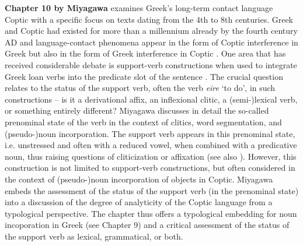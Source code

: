 \documentclass[output=paper,colorlinks,citecolor=brown]{langscibook}
\begin{document}
\textbf{Chapter 10 by Miyagawa} examines Greek’s long-term contact language Coptic with a specific focus on texts dating from the 4th to 8th centuries. Greek and Coptic had existed for more than a millennium already by the fourth century AD and language-contact phenomena appear in the form of Coptic interference in Greek \citep{fendelCopticInterferenceSyntax2022} but also in the form of Greek interference in Coptic \citep{grossmanLanguageSpecificTransitivitiesContact2019}. One area that has received considerable debate is support-verb constructions when used to integrate Greek loan verbs into the predicate slot of the sentence \citep{reintgesCodemixingStrategiesCoptic2001, egediRemarksLoanVerb2017, funkDifferentialLoanCoptic2017, grossmanDialectalVariationLanguage2017, grossmanLanguageSpecificTransitivitiesContact2019, grossmanTransitiveVerbsLexical2023}. The crucial question relates to the status of the support verb, often the verb  \textit{eire} ‘to do’, in such constructions – is it a derivational affix, an inflexional clitic, a (semi-)lexical verb, or something entirely different? Miyagawa discusses in detail the so-called prenominal state of the verb in the context of clitics, word segmentation, and (pseudo\nobreakdash-)noun incorporation. The support verb appears in this prenominal state, i.e. unstressed and often with a reduced vowel, when combined with a predicative noun, thus raising questions of cliticization or affixation (see also \citealt{grossmanTransitiveVerbsLexical2023}). However, this construction is not limited to support-verb constructions, but often considered in the context of (pseudo\nobreakdash-)noun incorporation of objects in Coptic. Miyagawa embeds the assessment of the status of the support verb (in the prenominal state) into a discussion of the degree of analyticity of the Coptic language from a typological perspective. The chapter thus offers a typological embedding for noun incoporation in Greek (see Chapter 9) and a critical assessment of the status of the support verb as lexical, grammatical, or both.   
\end{document}
